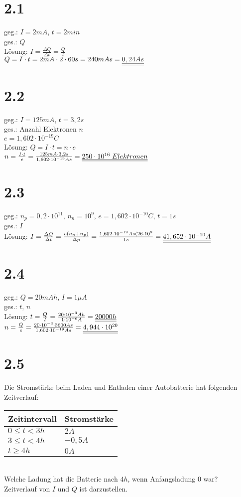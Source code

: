 \section*{2.1}

geg.: $I=2mA$, $t=2 min$\\
ges.: $Q$\\
Lösung: $\boxed{I=\frac{\Delta Q}{\Delta t}=\frac{Q}{t}}$\\
$Q=I\cdot t=2mA \cdot 2 \cdot 60s = 240 mAs = \underline{\underline{0,24 As}}$

\section*{2.2}

geg.: $I=125mA$, $t=3,2s$\\
ges.: Anzahl Elektronen $n$\\
$e = 1,602 \cdot 10^{-19}C$\\
Lösung: $Q=I\cdot t=n\cdot e$\\
$n=\frac{I\cdot t}{e}=\frac{125mA \cdot 3,2s}{1,602\cdot 10^{-19}As}=\underline{\underline{250\cdot 10^{16}\; Elektronen}}$

\section*{2.3}

geg.: $n_p=0,2\cdot 10^{11}$, $n_n=10^9$, $e=1,602\cdot 10^{-10} C$, $t=1s$\\
ges.: $I$\\
Lösung: $I=\frac{\Delta Q}{\Delta t}=\frac{e(n_n+n_p)}{\Delta p}=\frac{1,602\cdot 10^{-19}As(26\cdot 10^9}{1s}=\underline{\underline{41,652 \cdot 10^{-10}A}}$

\section*{2.4}

geg.: $Q=20mAh$, $I=1 \mu A$\\
ges.: $t$, $n$\\
Lösung: $t=\frac{Q}{I}=\frac{20\cdot 10^{-3}Ah}{1 \cdot 10^{-6}A}=\underline{\underline{20000h}}$\\
$n=\frac{Q}{e}=\frac{20\cdot 10^{-3}\cdot 3600 As}{1,602\cdot 10^{-19} As}=\underline{\underline{4,944\cdot 10^{20}}}$

\section*{2.5}
Die Stromstärke beim Laden und Entladen einer Autobatterie hat folgenden Zeitverlauf:\\
\begin{tabular}{l | l}
Zeitintervall & Stromstärke \\
\hline
$0 \leq t < 3h$ & $2A$\\
$3 \leq t < 4h$ & $-0,5A$\\
$t\geq 4h$ & $0A$
\end{tabular}\\
Welche Ladung hat die Batterie nach $4h$, wenn Anfangsladung $0$ war?\\
Zeitverlauf von $I$ und $Q$ ist darzustellen.

